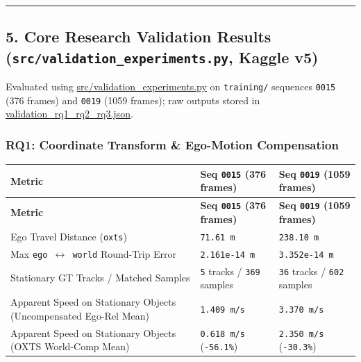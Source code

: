 \documentclass[10.5pt,a4paper]{article}
\begin{document}
\par\noindent\rule{\textwidth}{0.4pt}\par\medskip

\subsection{5. Core Research Validation Results (\texttt{src/\allowbreak{}validation\_\allowbreak{}experiments.\allowbreak{}py}, Kaggle v5)}

Evaluated using \href{https://github.com/Heisnotanimposter/Totalcare\_autonomous\_driving\_Yolov5/blob/main/src/validation\_experiments.py}{src/validation\_experiments.py} on \texttt{training/\allowbreak{}} sequences \texttt{0015} (376 frames) and \texttt{0019} (1059 frames); raw outputs stored in \href{https://github.com/Heisnotanimposter/Totalcare\_autonomous\_driving\_Yolov5/blob/main/results/world\_model/world\_outputs/validation\_rq1\_rq2\_rq3.json}{validation\_rq1\_rq2\_rq3.json}.


\subsubsection{RQ1: Coordinate Transform \& Ego-Motion Compensation}

\begin{footnotesize}
\setlength{\tabcolsep}{4pt}
\setlength{\LTleft}{0pt}\setlength{\LTright}{0pt}
\begin{longtable}{>{\raggedright\arraybackslash}p{} >{\raggedright\arraybackslash}p{} >{\raggedright\arraybackslash}p{}}
\toprule
\textbf{Metric} & \textbf{Seq \texttt{0015} (376 frames)} & \textbf{Seq \texttt{0019} (1059 frames)} \\
\midrule
\endfirsthead
\toprule
\textbf{Metric} & \textbf{Seq \texttt{0015} (376 frames)} & \textbf{Seq \texttt{0019} (1059 frames)} \\
\midrule
\endhead
\bottomrule
\endfoot
Ego Travel Distance (\texttt{oxts}) & \texttt{71.\allowbreak{}61 m} & \texttt{238.\allowbreak{}10 m} \\
Max \texttt{ego $\leftrightarrow$ world} Round-Trip Error & \texttt{2.\allowbreak{}161e-\allowbreak{}14 m} & \texttt{3.\allowbreak{}352e-\allowbreak{}14 m} \\
Stationary GT Tracks / Matched Samples & \texttt{5} tracks / \texttt{369} samples & \texttt{36} tracks / \texttt{602} samples \\
Apparent Speed on Stationary Objects (Uncompensated Ego-Rel Mean) & \texttt{1.\allowbreak{}409 m/\allowbreak{}s} & \texttt{3.\allowbreak{}370 m/\allowbreak{}s} \\
Apparent Speed on Stationary Objects (OXTS World-Comp Mean) & \texttt{0.\allowbreak{}618 m/\allowbreak{}s} (\texttt{-\allowbreak{}56.\allowbreak{}1\%}) & \texttt{2.\allowbreak{}350 m/\allowbreak{}s} (\texttt{-\allowbreak{}30.\allowbreak{}3\%}) \\
\end{longtable}
\end{footnotesize}
\end{document}
